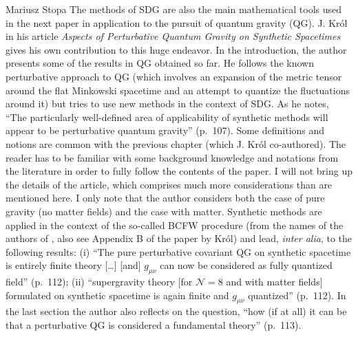 \begin{recengenv}{Mariusz Stopa}
The methods of SDG are also the main mathematical tools used in the next paper in application to the pursuit of quantum gravity (QG). J. Król in his article \textit{Aspects of Perturbative Quantum Gravity on Synthetic Spacetimes} gives his own contribution to this huge endeavor. In the introduction, the author presents some of the results in QG obtained so far. He follows the known perturbative approach to QG (which involves an expansion of the metric tensor around the flat Minkowski spacetime and an attempt to quantize the fluctuations around it) but tries to use new methods in the context of SDG. As he notes, ``The particularly well-defined area of applicability of synthetic methods will appear to be perturbative quantum gravity'' (p.~107). Some definitions and notions are common with the previous chapter (which J. Król co-authored). The reader has to be familiar with some background knowledge and notations from the literature in order to fully follow the contents of the paper. I will not bring up the details of the article, which comprises much more considerations than are mentioned here. I only note that the author considers both the case of pure gravity (no matter fields) and the case with matter. Synthetic methods are applied in the context of the so-called BCFW procedure (from the names of the authors of \parencite{britto-2005}, also see Appendix B of the paper by Król) and lead, \textit{inter alia}, to the following results: (i) ``The pure perturbative covariant QG on synthetic spacetime is entirely finite theory [\ldots] [and] $ g_{\mu\nu} $ can now be considered as fully quantized field'' (p.~112); (ii) ``supergravity theory [for $ \mathcal{N}=8 $ and with matter fields] formulated on synthetic spacetime is again finite and $ g_{\mu\nu} $ quantized'' (p.~112). In the last section the author also reflects on the question, ``how (if at all) it can be that a perturbative QG is considered a fundamental theory'' (p.~113).


\end{recengenv}
